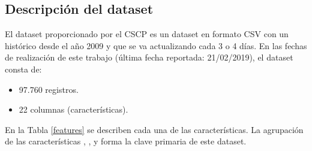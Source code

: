 \subsection{Descripción del dataset}

El dataset proporcionado por el CSCP es un dataset en formato CSV con un histórico desde el año 2009 y que se va actualizando cada 3 o 4 días. En las fechas de realización de este trabajo (última fecha reportada: 21/02/2019), el dataset consta de:

\begin{itemize}
 \item 97.760 registros.
 \item 22 columnas (características).
\end{itemize}

En la Tabla \ref{features} se describen cada una de las características. La agrupación de las características , ,  y  forma la clave primaria de este dataset.

